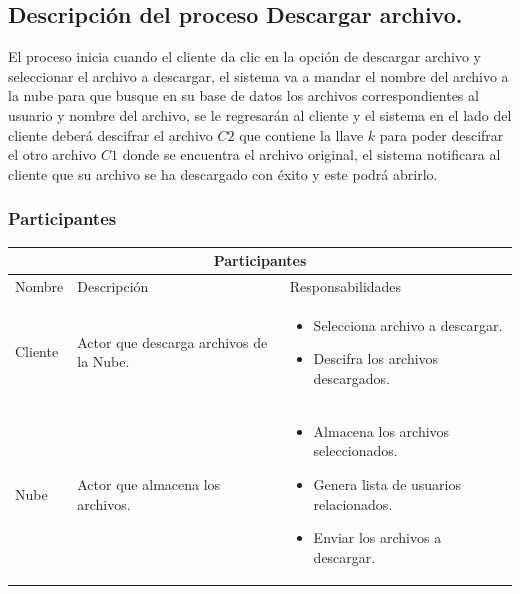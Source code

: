 \subsection{Descripción del proceso Descargar archivo.}

El proceso inicia cuando el cliente da clic en la opción de descargar archivo y seleccionar el archivo a descargar, el sistema va a mandar el nombre del archivo a la nube para que busque en su base de datos los archivos correspondientes al usuario y nombre del archivo, se le regresarán al cliente y el sistema en el lado del cliente deberá descifrar el archivo $C2$ que contiene la llave $k$ para poder descifrar el otro archivo $C1$ donde se encuentra el archivo original, el sistema notificara al cliente que su archivo se ha descargado con éxito y este podrá abrirlo. \\


\subsubsection{Participantes}

\begin{tabular}{ |p{2cm}|p{6cm}|p{6cm}|  }
\hline
\multicolumn{3}{|c|}{  Participantes  } \\
\hline

{ Nombre }  & { Descripción } & { Responsabilidades} \\
\hline
{ Cliente } &   Actor que descarga archivos de la Nube.  &  
			\begin{itemize}	
				\item Selecciona archivo a descargar.
				\item Descifra los archivos descargados.
			\end{itemize}   \\ 
\hline
{ Nube } &   Actor que almacena los archivos.  &  
			\begin{itemize}	
				\item Almacena los archivos seleccionados.
				\item Genera lista de usuarios relacionados.
				\item Enviar los archivos a descargar.
			\end{itemize}   \\ 
\hline
\end{tabular}

